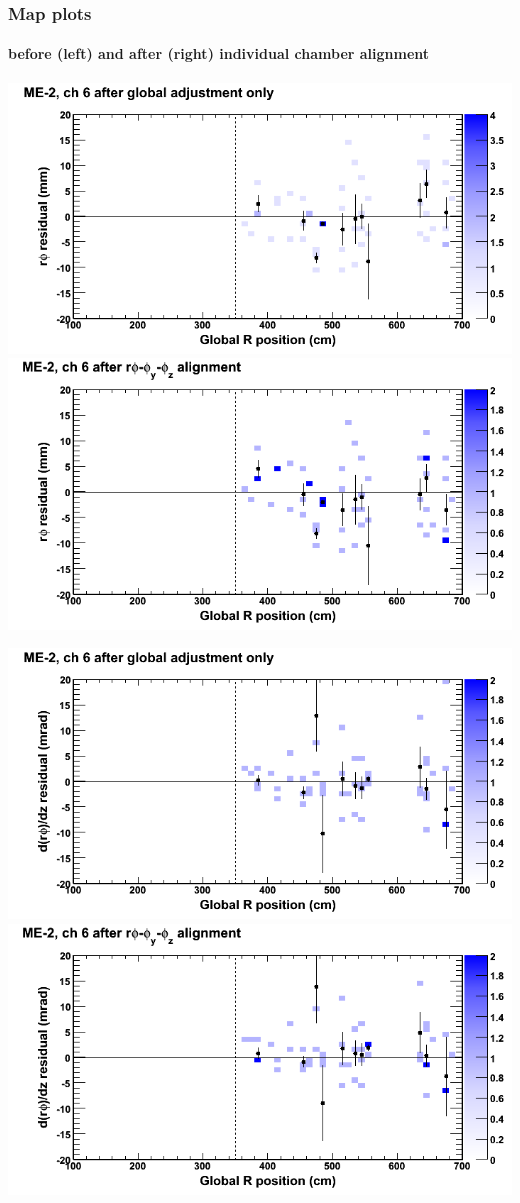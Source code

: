 \documentclass[compress]{beamer}
\begin{document}
\begin{frame}
\frametitle{Map plots}
\framesubtitle{before (left) and after (right) individual chamber alignment}
\includegraphics[width=0.5\linewidth]{ringmapplots_3dof/before_CSCvsr_mem2ch06_x.png} \includegraphics[width=0.5\linewidth]{ringmapplots_3dof/after_CSCvsr_mem2ch06_x.png}

\includegraphics[width=0.5\linewidth]{ringmapplots_3dof/before_CSCvsr_mem2ch06_dxdz.png} \includegraphics[width=0.5\linewidth]{ringmapplots_3dof/after_CSCvsr_mem2ch06_dxdz.png}
\end{frame}
\end{document}

